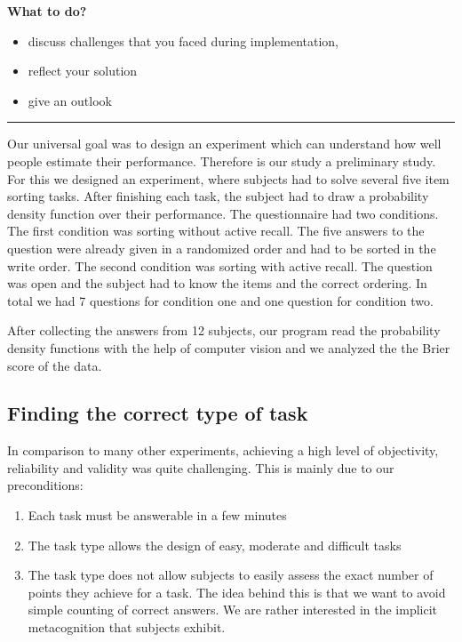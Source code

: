 \documentclass[../main/main.tex]{subfiles}
\begin{document}
	\textbf{What to do?}
	\begin{itemize}
		\item discuss challenges that you faced during implementation, 
		\item reflect your solution
		\item give an outlook
	\end{itemize}

	\noindent\rule{\textwidth}{.4pt}
	
	\vspace{2mm}
	
	\noindent Our universal goal was to design an experiment which can understand how well people estimate their performance. Therefore is our study a preliminary study. For this we designed an experiment, where subjects had to solve several five item sorting tasks. After finishing each task, the subject had to draw a probability density function over their performance. The questionnaire had two conditions. The first condition was sorting without active recall. The five answers to the question were already given in a randomized order and had to be sorted in the write order. The second condition was sorting with active recall. The question was open and the subject had to know the items and the correct ordering. In total we had 7 questions for condition one and one question for condition two.
	
	After collecting the answers from 12 subjects, our program read the probability density functions with the help of computer vision and we analyzed the the Brier score of the data.
	
	\subsection{Finding the correct type of task}
	
	In comparison to many other experiments, achieving a high level of objectivity, reliability and validity was quite challenging. This is mainly due to our preconditions:
	
	\begin{enumerate}
		\item Each task must be answerable in a few minutes
		\item The task type allows the design of easy, moderate and difficult tasks
		\item The task type does not allow subjects to easily assess the exact number of points they achieve for a task. The idea behind this is that we want to avoid simple counting of correct answers. We are rather interested in the implicit metacognition that subjects exhibit. 
	\end{enumerate}
\end{document}
